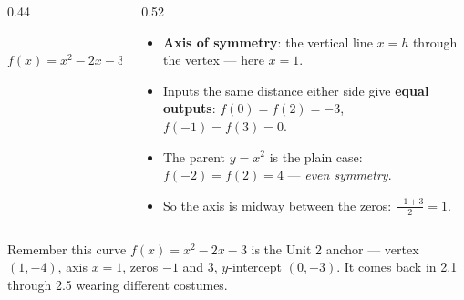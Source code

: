 \documentclass[aspectratio=169, 11pt]{beamer}
\newcommand{\lgrid}[4]{%
  \draw[step=1, linegray!40, very thin] (#1,#3) grid (#2,#4);
  \draw[->, thick, charcoal] (#1,0)--(#2,0) node[below right, font=\tiny]{$x$};
  \draw[->, thick, charcoal] (0,#3)--(0,#4) node[left, font=\tiny]{$y$};}
\newcommand{\fdot}[3]{\fill[#1] (#2,#3) circle (3.0pt);}
\begin{document}
\begin{frame}[t, plain]
  \begin{columns}[T]
    \begin{column}{0.44\textwidth}
      \centering
       \\[2pt]
      $f(x)=x^2-2x-3=(x-1)^2-4$
    \end{column}
    \begin{column}{0.52\textwidth}
      \begin{itemize}\setlength{\itemsep}{4pt}
        \item \textbf{Axis of symmetry}: the vertical line $x=h$ through the vertex --- here
              $x=1$.
        \item Inputs the same distance either side give \textbf{equal outputs}:
              $f(0)=f(2)=-3$, \; $f(-1)=f(3)=0$.
        \item The parent $y=x^2$ is the plain case: $f(-2)=f(2)=4$ --- \emph{even symmetry}.
        \item So the axis is midway between the zeros: $\frac{-1+3}{2}=1$.
      \end{itemize}
    \end{column}
  \end{columns}
  \vspace{3pt}
  \begin{block}{Remember this curve}
    $f(x)=x^2-2x-3$ is the Unit 2 anchor --- vertex $(1,-4)$, axis $x=1$, zeros $-1$ and $3$,
    $y$-intercept $(0,-3)$. It comes back in 2.1 through 2.5 wearing different costumes.
  \end{block}
\end{frame}
\end{document}
